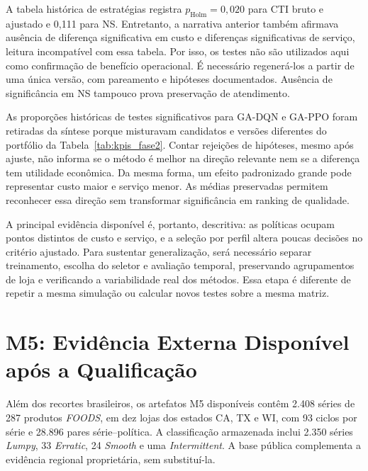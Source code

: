 A tabela histórica de estratégias registra $p_{\mathrm{Holm}}=0{,}020$ para CTI bruto e ajustado e 0,111 para NS. Entretanto, a narrativa anterior também afirmava ausência de diferença significativa em custo e diferenças significativas de serviço, leitura incompatível com essa tabela. Por isso, os testes não são utilizados aqui como confirmação de benefício operacional. É necessário regenerá-los a partir de uma única versão, com pareamento e hipóteses documentados. Ausência de significância em NS tampouco prova preservação de atendimento.

As proporções históricas de testes significativos para GA-DQN e GA-PPO foram retiradas da síntese porque misturavam candidatos e versões diferentes do portfólio da Tabela~\ref{tab:kpis_fase2}. Contar rejeições de hipóteses, mesmo após ajuste, não informa se o método é melhor na direção relevante nem se a diferença tem utilidade econômica. Da mesma forma, um efeito padronizado grande pode representar custo maior e serviço menor. As médias preservadas permitem reconhecer essa direção sem transformar significância em ranking de qualidade.

A principal evidência disponível é, portanto, descritiva: as políticas ocupam pontos distintos de custo e serviço, e a seleção por perfil altera poucas decisões no critério ajustado. Para sustentar generalização, será necessário separar treinamento, escolha do seletor e avaliação temporal, preservando agrupamentos de loja e verificando a variabilidade real dos métodos. Essa etapa é diferente de repetir a mesma simulação ou calcular novos testes sobre a mesma matriz.

\section{M5: Evidência Externa Disponível após a Qualificação}
\label{sec:resultados_m5}

Além dos recortes brasileiros, os artefatos M5 disponíveis contêm 2.408 séries de 287 produtos \textit{FOODS}, em dez lojas dos estados CA, TX e WI, com 93 ciclos por série e 28.896 pares série--política. A classificação armazenada inclui 2.350 séries \textit{Lumpy}, 33 \textit{Erratic}, 24 \textit{Smooth} e uma \textit{Intermittent}. A base pública complementa a evidência regional proprietária, sem substituí-la.

